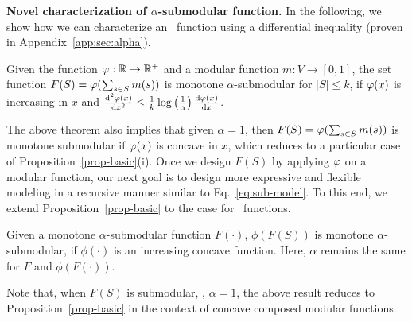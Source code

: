 \documentclass{article}
\newcommand{\xhdr}[1]{\noindent\textbf{#1.}}
\def\d{\mathrm{d}}
\begin{document}
\xhdr{Novel characterization of $\alpha$-submodular function} 
In the following, we show how we can characterize an \asb\ function
using a differential inequality (proven in Appendix~\ref{app:sec:alpha}). 
%
\begin{theorem}\label{thm:diffc}
Given the function $\varphi:\mathbb{R}\to\mathbb{R}^+$ and a modular function $m:V\to[0,1]$, the set function $F(S) = \varphi(\sum_{s\in S}m(s))$  is monotone $\alpha$-submodular for  $|S|\le k$, if $\varphi(x)$ is increasing in $x$ and
$\frac{\d ^2 \diffc(x)}{\d x^2} \le \frac{1}{k}\log\left(\frac{1}{\alpha}\right)\frac{\d \diffc(x)}{\d x}$.
\end{theorem}
The above theorem also implies that 
given $\alpha=1$, then $F(S) =  \varphi(\sum_{s\in S}m(s))$ is monotone submodular if $\varphi(x)$ is concave in $x$, which reduces to a particular case of Proposition~\ref{prop-basic}(i). 
%
Once we design $F(S)$ by applying $\varphi$ on a modular function, our next goal is to design more expressive and flexible modeling in a recursive manner similar to Eq.~\eqref{eq:sub-model}. To this end, we extend Proposition~\ref{prop-basic} to the case for \asb\ functions.

\begin{proposition}
\label{prop:alpha1}
Given a monotone $\alpha$-submodular function $F(\cdot)$, $\phi(F(S))$ is monotone $\alpha$-submodular, if $\phi(\cdot)$  is an increasing concave function.  Here, $\alpha$ remains the same for $F$ and $\phi(F(\cdot))$.
\end{proposition}
%
Note that, when $F(S)$ is submodular, \ie, $\alpha=1$, the above result reduces to Proposition~\ref{prop-basic} in the context of concave composed modular functions. 
\end{document}
